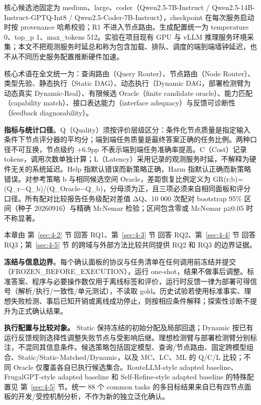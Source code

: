 核心候选池固定为 medium、large、coder（Qwen2.5-7B-Instruct / Qwen2.5-14B-Instruct-GPTQ-Int8 / Qwen2.5-Coder-7B-Instruct），checkpoint 在每次服务启动时按 provenance 哈希校验；R1 不进入节点路由。生成配置统一为 temperature 0、top\_p 1、max\_tokens 512。实验在项目现有 GPU 与 vLLM\cite{kwon2023vllm} 推理服务环境采集；本文不把观测服务时延总和称为包含加载、排队、调度的端到端墙钟延迟，也不从不同历史服务配置推断硬件加速。

核心术语在全文统一为：查询路由（Query Router）、节点路由（Node Router）、类型先验、静态执行（Static DAG）、动态执行（Dynamic DAG，部署检测臂为动态真实 Dynamic-Real）、有限候选 Oracle（finite candidate oracle）、能力匹配（capability match）、接口表达能力（interface adequacy）与反馈可诊断性（feedback diagnosability）。

\textbf{指标与统计口径}。Q（Quality）须按评价层级区分：条件化节点质量是指定输入条件下节点评分器的平均分；端到端任务质量是最终答案正确的任务比例。两种口径不可互换，节点级约 +6.9pp 不表示端到端任务准确率提高。C（Cost）记录 tokens，调用次数单独计算；L（Latency）采用记录的观测服务时延，不解释为硬件无关的系统延迟。Help 指默认错误而新策略正确，Harm 指默认正确而新策略错误。对参考策略 b 与相同候选空间 Oracle，差距恢复比例定义为 GR(r;b)=(Q\_r−Q\_b)/(Q\_Oracle−Q\_b)，分母须为正，且三项必须来自相同面板和评分口径。所有配对比较报告任务级配对差值 ΔQ、10 000 次配对 bootstrap 95\% 区间（种子 20260916）与精确 McNemar 检验；区间包含零或 McNemar p≥0.05 时不称显著。

本章由 第~\ref{sec:4-2} 节 回答 RQ1、第~\ref{sec:4-3} 节 回答 RQ2、第~\ref{sec:4-4} 节 回答 RQ3；第~\ref{sec:4-5} 节 的跨域与外部方法比较共同提供 RQ2 和 RQ3 的边界证据。

\textbf{冻结与信息边界}。每个确认面板的协议与任务清单在任何调用前冻结并提交（FROZEN\_BEFORE\_EXECUTION），运行 one-shot，结果不做事后调整。标准答案、程序与必要操作数仅用于离线标签和评价，运行时反馈一律为部署可得信号（解析/执行/一致性/单元测试），不读取 gold。历史试验若使用标准事实、理想失败检测、事后已知开销或离线成功停止，则按相应条件解释；探索性诊断不提升为正式确认结果。

\textbf{执行配置与比较对象。} Static 保持冻结的初始分配及局部回退；Dynamic 按已有运行反馈规则选择性调整失败节点与受影响后继。理想检测臂与部署检测臂分别标注，不混同其信息条件。候选策略包括固定模型、查询/节点路由、固定跨模型组合、Static/Static-Matched/Dynamic，以及 MC、LC、ML 的 Q/C/L 比较；不同 Oracle 仅覆盖各自已执行候选集合。RouteLLM-style adapted baseline、FrugalGPT-style adapted baseline 和 Self-Refine-style adapted baseline 的特殊配置见 第~\ref{sec:4-5} 节。统一 88 个 common tasks 的多目标结果来自已有四节点面板的开发/受控机制分析，不作为新的独立泛化确认。

